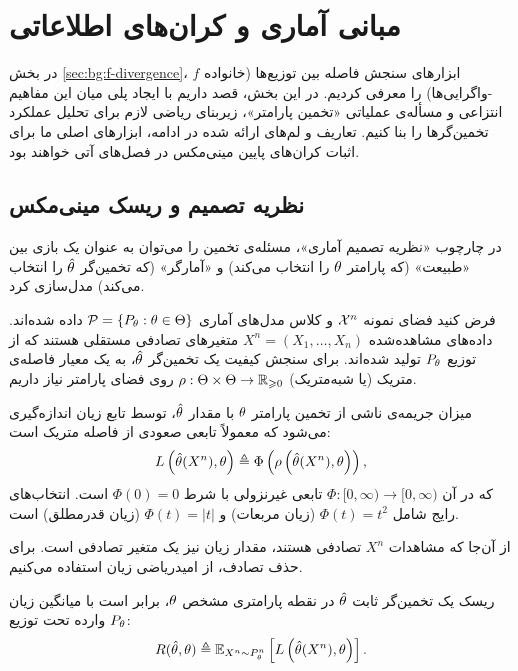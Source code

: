 \section{مبانی آماری و کران‌های اطلاعاتی}
\label{sec:bg:statistical-foundations}

در بخش \ref{sec:bg:f-divergence}، ابزارهای سنجش فاصله بین توزیع‌ها (خانواده $f$-واگرایی‌ها) را معرفی کردیم. در این بخش، قصد داریم با ایجاد پلی میان این مفاهیم انتزاعی و مسأله‌ی عملیاتی «تخمین پارامتر»، زیربنای ریاضی لازم برای تحلیل عملکرد تخمین‌گرها را بنا کنیم. تعاریف و لم‌های ارائه شده در ادامه، ابزارهای اصلی ما برای اثبات کران‌های پایین مینی‌مکس در فصل‌های آتی خواهند بود.

 \subsection{نظریه تصمیم و ریسک مینی‌مکس}
\label{sec:bg:minimax-risk}

در چارچوب «نظریه تصمیم آماری»، مسئله‌ی تخمین را می‌توان به عنوان یک بازی بین «طبیعت» (که پارامتر $\theta$ را انتخاب می‌کند) و «آمارگر» (که تخمین‌گر $\hat{\theta}$ را انتخاب می‌کند) مدل‌سازی کرد.

فرض کنید فضای نمونه $\Xset^n$ و کلاس مدل‌های آماری $\mathcal{P} = \{P_{\theta} : \theta \in \Theta\}$ داده شده‌اند. داده‌های مشاهده‌شده $X^n = (X_1, \dots, X_n)$ متغیرهای تصادفی مستقلی هستند که از توزیع $P_{\theta}$ تولید شده‌اند. برای سنجش کیفیت یک تخمین‌گر $\hat{\theta}$، به یک معیار فاصله‌ی متریک (یا شبه‌متریک) $\rho: \Theta \times \Theta \to \mathbb{R}_{\geqslant 0}$ روی فضای پارامتر نیاز داریم.

\begin{تعریف}
میزان جریمه‌ی ناشی از تخمین پارامتر $\theta$ با مقدار $\hat{\theta}$، توسط تابع زیان اندازه‌گیری می‌شود که معمولاً تابعی صعودی از فاصله متریک است:
\begin{equation}
L\left(\hat{\theta}(X^n), \theta\right) \triangleq \Phi\left( \rho\left(\hat{\theta}(X^n), \theta\right) \right),
\end{equation}
که در آن $\Phi: [0, \infty) \to [0, \infty)$ تابعی غیرنزولی با شرط $\Phi(0)=0$ است. انتخاب‌های رایج شامل $\Phi(t)=t^2$ (زیان مربعات) و $\Phi(t)=|t|$ (زیان قدرمطلق) است.
\end{تعریف}

از آن‌جا که مشاهدات $X^n$ تصادفی هستند، مقدار زیان نیز یک متغیر تصادفی است. برای حذف تصادف، از امیدریاضی زیان استفاده می‌کنیم.

\begin{تعریف}
ریسک یک تخمین‌گر ثابت $\hat{\theta}$ در نقطه پارامتری مشخص $\theta$، برابر است با میانگین زیان وارده تحت توزیع $P_{\theta}$:
\begin{equation}
R(\hat{\thh}, \thh) \triangleq \Eset_{X^n \sim P_\thh^n} \left[ L\left(\hat{\thh}(X^n), \thh\right) \right].
\end{equation}
\end{تعریف}

